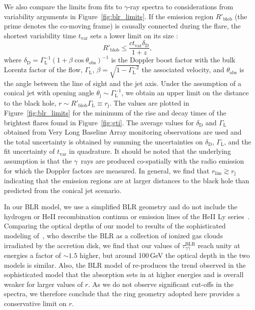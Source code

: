 \documentclass[twocolumn,linenumbers]{aastex62}
\newcommand{\Grays}{$\gamma$~rays\xspace}
\newcommand{\gray}{$\gamma$-ray\xspace}
\begin{document}
We also compare the limits from fits to \gray spectra to considerations from variability arguments in Figure~\ref{fig:blr_limits}.
If the emission region $R'_\mathrm{blob}$ (the prime denotes the co-moving frame) is causally connected during the flare, the shortest variability time $t_\mathrm{var}$ sets a lower limit on its size \citep[e.g.,][]{2008MNRAS.384L..19B}:
\begin{equation}
    R'_\mathrm{blob} \leqslant \frac{ct_\mathrm{var}\delta_\mathrm{D}}{1+z},
    \label{eq:rblob}
\end{equation}
where $\delta_\mathrm{D} = \Gamma^{-1}_\mathrm{L}(1 + \beta\cos\theta_\mathrm{obs})^{-1}$ is the Doppler boost factor with the bulk Lorentz factor of the flow, $\Gamma_\mathrm{L}$, $\beta = \sqrt{1 - \Gamma_\mathrm{L}^{-2}}$ the associated velocity, and $\theta_\mathrm{obs} $ is the angle between the line of sight and the jet axis.
Under the assumption of a conical jet with opening angle $\theta_\mathrm{j} \sim \Gamma^{-1}_\mathrm{L}$, we obtain an upper limit on the distance to the black hole, $r \sim R'_\mathrm{blob}\Gamma_\mathrm{L} \equiv r_\mathrm{j}$.
The values are plotted in Figure~\ref{fig:blr_limits} for the minimum of the rise and decay times of the brightest flares found in Figure~\ref{fig:gti}.
The average values for $\delta_\mathrm{D}$ and $\Gamma_\mathrm{L}$ obtained from Very Long Baseline Array monitoring observations are used \citep[see also Table~\ref{tab:src-select}]{2017ApJ...846...98J}  and the total  uncertainty is obtained by summing the uncertainties on $\delta_\mathrm{D}$, $\Gamma_\mathrm{L}$, and the fit uncertainty of $t_\mathrm{var}$ in quadrature.
It should be noted that the underlying assumption is that the \Grays are produced co-spatially with the radio emission for which the Doppler factors are measured.  
In general, we find that $r_\mathrm{lim} \gtrsim r_\mathrm{j}$ indicating that the emission regions are at larger distances to the black hole than predicted from the conical jet scenario.  

In our BLR model, we use a simplified BLR geometry and do not include the hydrogen or HeII recombination continua or emission lines of the HeII Ly series~\citep[as done in, e.g.,][]{2010ApJ...717L.118P,2014ApJ...794....8S}. 
Comparing the optical depths of our model to results of the sophisticated modeling of~\citet[see in particular their Figure~11]{2017MNRAS.464..152A}, who describe the BLR as a collection of ionized gas clouds irradiated by the accretion disk, we find that our values of $\tau_{\gamma\gamma}^\mathrm{BLR}$ reach unity at energies a factor of $\sim1.5$ higher, but around 100\,GeV the optical depth in the two models is similar. 
Also, the BLR model of \citet{finke2016} re-produces the trend observed in the sophisticated model that the absorption sets in at higher energies and is overall weaker for larger values of $r$. 
As we do not observe significant cut-offs in the spectra, we therefore conclude that the ring geometry adopted here provides a conservative limit on $r$. 
\end{document}
